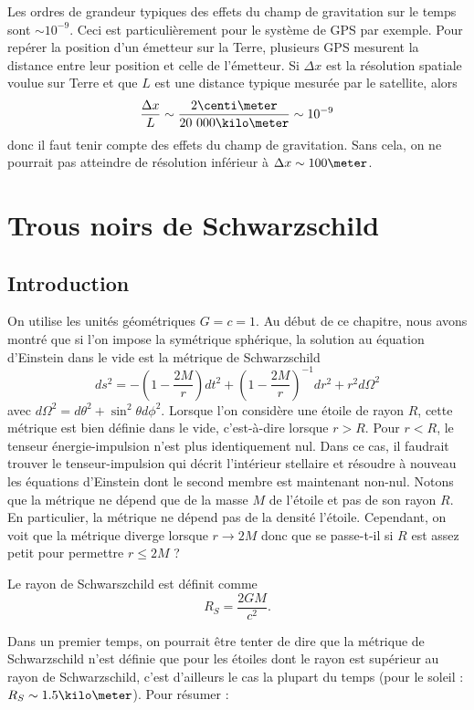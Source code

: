 \documentclass[a4paper,11pt]{report}
\begin{document}
        Les ordres de grandeur typiques des effets du champ de gravitation sur le temps sont $\sim10^{-9}$. Ceci est particulièrement pour le système de GPS par exemple. Pour repérer la position d'un émetteur sur la Terre, plusieurs GPS mesurent la distance entre leur position et celle de l'émetteur. Si $\Delta x$ est la résolution spatiale voulue sur Terre et que $L$ est une distance typique mesurée par le satellite, alors
        \begin{equation}
            \frac{\Delta x}{L}\sim\frac{2\centi\meter}{20~000\kilo\meter}\sim10^{-9}
        \end{equation}
        donc il faut tenir compte des effets du champ de gravitation. Sans cela, on ne pourrait pas atteindre de résolution inférieur à $\Delta x\sim100\meter$.
        
    \section{Trous noirs de Schwarzschild}
    
        \subsection{Introduction}
    
            On utilise les unités géométriques $G = c = 1$. Au début de ce chapitre, nous avons montré que si l'on impose la symétrique sphérique, la solution au équation d'Einstein dans le vide est la métrique de Schwarzschild
            \begin{equation}
                ds^2 = -\left( 1-\frac{2M}{r} \right)dt^2 + \left( 1-\frac{2M}{r} \right)^{-1}dr^2 + r^2d\Omega^2
            \end{equation}
            avec $d\Omega^2 = d\theta^2+\sin^2\theta d\phi^2$. Lorsque l'on considère une étoile de rayon $R$, cette métrique est bien définie dans le vide, c'est-à-dire lorsque $r>R$. Pour $r<R$, le tenseur énergie-impulsion n'est plus identiquement nul. Dans ce cas, il faudrait trouver le tenseur-impulsion qui décrit l'intérieur stellaire et résoudre à nouveau les équations d'Einstein dont le second membre est maintenant non-nul. Notons que la métrique ne dépend que de la masse $M$ de l'étoile et pas de son rayon $R$. En particulier, la métrique ne dépend pas de la densité l'étoile. Cependant, on voit que la métrique diverge lorsque $r\to2M$ donc que se passe-t-il si $R$ est assez petit pour permettre $r\leq2M$ ? 
            \begin{defn}
                Le rayon de Schwarszchild est définit comme  
                \begin{equation}
                    R_S =\frac{2GM}{c^2}.
                \end{equation}
            \end{defn}
            Dans un premier temps, on pourrait être tenter de dire que la métrique de Schwarzschild n'est définie que pour les étoiles dont le rayon est supérieur au rayon de Schwarzschild, c'est d'ailleurs le cas la plupart du temps (pour le soleil : $R_S\sim 1.5\kilo\meter$). Pour résumer :
            
\end{document}
